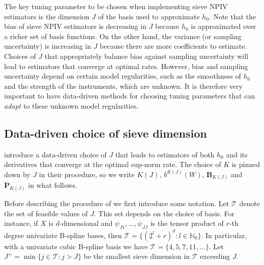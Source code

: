 \documentclass[
]{jss}
\begin{document}
The key tuning parameter to be chosen when implementing sieve NPIV
estimators is the dimension \(J\) of the basis used to approximate
\(h_0\). Note that the bias of sieve NPIV estimators is decreasing in
\(J\) because \(h_0\) is approximated over a richer set of basis
functions. On the other hand, the variance (or sampling uncertainty) is
increasing in \(J\) because there are more coefficients to estimate.
Choices of \(J\) that appropriately balance bias against sampling
uncertainty will lead to estimators that converge at optimal rates.
However, bias and sampling uncertainty depend on certain model
regularities, such as the smoothness of \(h_0\) and the strength of the
instruments, which are unknown. It is therefore very important to have
data-driven methods for choosing tuning parameters that can \emph{adapt}
to these unknown model regularities.

\hypertarget{data-driven-choice-of-sieve-dimension}{%
\subsection{Data-driven choice of sieve
dimension}\label{data-driven-choice-of-sieve-dimension}}

\citet{CCK} introduce a data-driven choice of \(J\) that leads to
estimators of both \(h_0\) and its derivatives that converge at the
optimal sup-norm rate. The choice of \(K\) is pinned down by \(J\) in
their procedure, so we write \(K(J)\), \(b^{K(J)}(W)\),
\(\mathbf B_{K(J)}\) and \(\mathbf P_{K(J)}\) in what follows.

Before describing the procedure of \citet{CCK} we first introduce some
notation. Let \(\mathcal T\) denote the set of feasible values of \(J\).
This set depends on the choice of basis. For instance, if \(X\) is
\(d\)-dimensional and \(\psi_{J1},\ldots,\psi_{JJ}\) is the tensor
product of \(r\)-th degree univariate B-spline bases, then
\(\mathcal T = \{(2^l + r)^d : l \in \mathbb N_0 \}\). In particular,
with a univariate cubic B-spline basis we have
\(\mathcal T = \{4,5,7, 11, ...\}\). Let
\(J^+ = \min\{j \in \mathcal T : j > J\}\) be the smallest sieve
dimension in \(\mathcal T\) exceeding \(J\).
\end{document}
